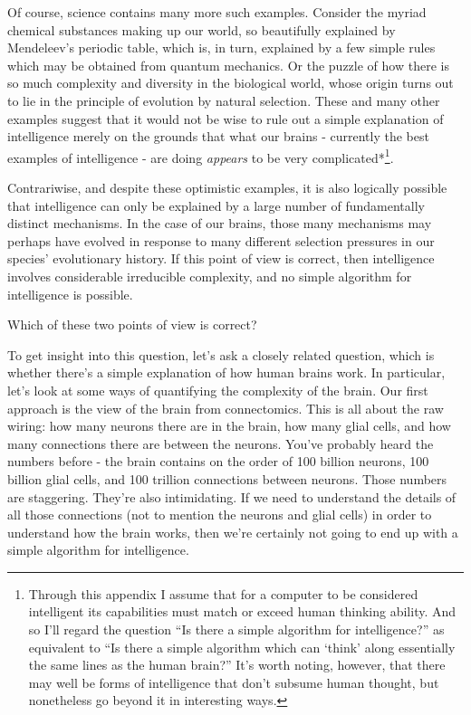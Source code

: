 Of course, science contains many more such examples. Consider the myriad chemical substances making up our world, so beautifully explained by Mendeleev's periodic table, which is, in turn, explained by a few simple rules which may be obtained from quantum mechanics. Or the puzzle of how there is so much complexity and diversity in the biological world, whose origin turns out to lie in the principle of evolution by natural selection. These and many other examples suggest that it would not be wise to rule out a simple explanation of intelligence merely on the grounds that what our brains - currently the best examples of intelligence - are doing \emph{appears} to be very complicated*\footnote{Through this appendix I assume that for a computer to be considered intelligent its capabilities must match or exceed human thinking ability. And so I'll regard the question ``Is there a simple algorithm for intelligence?'' as equivalent to ``Is there a simple algorithm which can `think' along essentially the same lines as the human brain?'' It's worth noting, however, that there may well be forms of intelligence that don't subsume human thought, but nonetheless go beyond it in interesting ways.}.


Contrariwise, and despite these optimistic examples, it is also logically possible that intelligence can only be explained by a large number of fundamentally distinct mechanisms. In the case of our brains, those many mechanisms may perhaps have evolved in response to many different selection pressures in our species' evolutionary history. If this point of view is correct, then intelligence involves considerable irreducible complexity, and no simple algorithm for intelligence is possible.


Which of these two points of view is correct?


To get insight into this question, let's ask a closely related question, which is whether there's a simple explanation of how human brains work. In particular, let's look at some ways of quantifying the complexity of the brain. Our first approach is the view of the brain from connectomics. This is all about the raw wiring: how many neurons there are in the brain, how many glial cells, and how many connections there are between the neurons. You've probably heard the numbers before - the brain contains on the order of 100 billion neurons, 100 billion glial cells, and 100 trillion connections between neurons. Those numbers are staggering. They're also intimidating. If we need to understand the details of all those connections (not to mention the neurons and glial cells) in order to understand how the brain works, then we're certainly not going to end up with a simple algorithm for intelligence.


